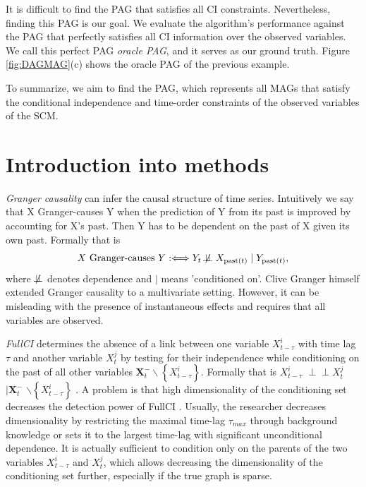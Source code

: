 \documentclass[conference]{IEEEtran}
\begin{document}
It is difficult to find the PAG that satisfies all CI constraints.
Nevertheless, finding this PAG is our goal. We evaluate the algorithm's performance against the PAG that perfectly satisfies all CI information over the observed variables. We call this perfect PAG \textit{oracle PAG}, and it serves as our ground truth.
Figure \ref{fig:DAGMAG}(c) shows the oracle PAG of the previous example. 

To summarize, we aim to find the PAG, which represents all MAGs that satisfy the conditional independence and time-order constraints of the observed variables of the SCM.


\section{Introduction into methods}
\textit{Granger causality} can infer the causal structure of time series. Intuitively we say that X Granger-causes Y when the prediction of Y from its past is improved by accounting for X's past.
Then Y has to be dependent on the past of X given its own past. Formally that is
\begin{equation}
X \text { Granger-causes } Y: \Longleftrightarrow Y_{t} \not\!\perp\!\!\!\perp X_{\operatorname{past}(t)}  \mid Y_{\operatorname{past}(t)},
\end{equation}
where $\not\!\perp\!\!\!\perp$ denotes dependence and $|$ means 'conditioned on'\cite[p.~204]{peters_elements_2018}.
Clive Granger himself extended Granger causality to a multivariate setting\cite{granger_testing_1980}. However, it can be misleading with the presence of instantaneous effects \cite{granger_clive_recent_1988} and requires that all variables are observed\cite{granger_testing_1980}.

\textit{FullCI} determines the absence of a link between one variable $X_{t-\tau}^{i}$ with time lag $\tau$ and another variable $X_{t}^{j}$ by testing for their independence while conditioning on the past of all other variables $\mathbf{X}_{t}^{-} \backslash\left\{X_{t-\tau}^{i}\right\}$. 
Formally that is
$X_{t-\tau}^{i} $
$\!\perp\!\!\!\perp X_{t}^{j} $
$\mid \mathbf{X}_{t}^{-}$
$ \backslash\left\{X_{t-\tau}^{i}\right\}$ \cite{runge_pcmci_2019}.
A problem is that high dimensionality of the conditioning set decreases the detection power of FullCI \cite{runge_pcmci_2019}.
Usually, the researcher decreases dimensionality by restricting the maximal time-lag $\tau_{max}$ through background knowledge or sets it to the largest time-lag with significant unconditional dependence\cite{runge_pcmci_2019}.
It is actually sufficient to condition only on the parents of the two variables $X_{t-\tau}^{i}$ and $X_{t}^{j}$\cite{pearl_causality_2000}, which allows decreasing the dimensionality of the conditioning set further, especially if the true graph is sparse.
\end{document}
